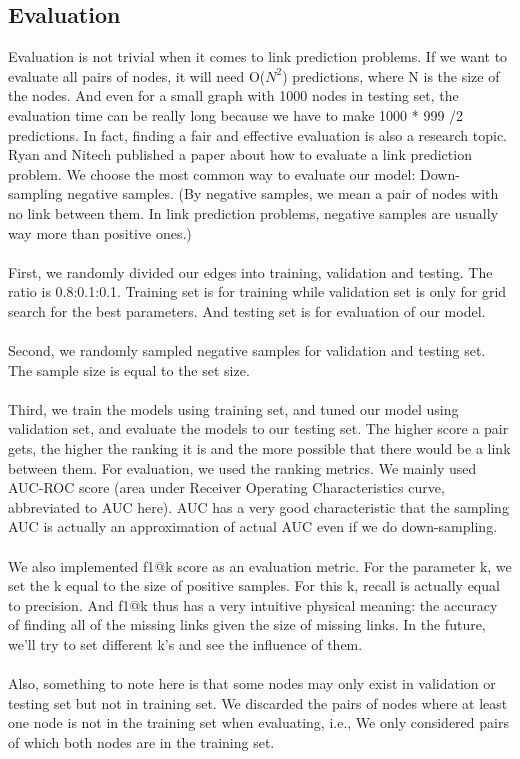 \documentclass[12pt]{article}
\begin{document}
\subsection{Evaluation}
Evaluation is not trivial when it comes to link prediction problems. If we want to evaluate all pairs of nodes, it will need O($N^2$) predictions, where N is the size of the nodes. And even for a small graph with 1000 nodes in testing set, the evaluation time can be really long because we have to make 1000 * 999 /2 predictions. In fact, finding a fair and effective evaluation is also a research topic. Ryan and Nitech published a paper \cite{eval} about how to evaluate a link prediction problem. We choose the most common way to evaluate our model: Down-sampling negative samples. (By negative samples, we mean a pair of nodes with no link between them. In link prediction problems, negative samples are usually way more than positive ones.)
\\
\\
First, we randomly divided our edges into training, validation and testing. The ratio is 0.8:0.1:0.1. Training set is for training while validation set is only for grid search for the best parameters. And testing set is for evaluation of our model. 
\\
\\
Second, we randomly sampled negative samples for validation and testing set. The sample size is equal to the set size.
\\
\\
Third, we train the models using training set, and tuned our model using validation set, and evaluate the models to our testing set. The higher score a pair gets, the higher the ranking it is and the more possible that there would be a link between them. For evaluation, we used the ranking metrics. We mainly used AUC-ROC score (area under Receiver Operating Characteristics curve, abbreviated to AUC here). AUC has a very good characteristic that the sampling AUC is actually an approximation of actual AUC even if we do down-sampling. 
\\
\\
We also implemented f1@k score as an evaluation metric. For the parameter k, we set the k equal to the size of positive samples. For this k, recall is actually equal to precision. And f1@k thus has a very intuitive physical meaning: the accuracy of finding all of the missing links given the size of missing links. In the future, we'll try to set different k's and see the influence of them. 
\\
\\
Also, something to note here is that some nodes may only exist in validation or testing set but not in training set. We discarded the pairs of nodes where at least one node is not in the training set when evaluating, i.e., We only considered pairs of which both nodes are in the training set.
\end{document}
